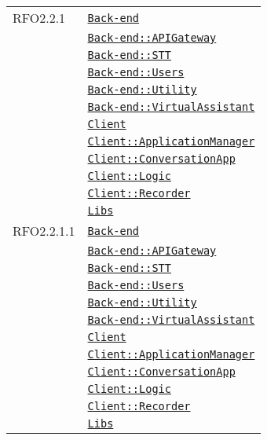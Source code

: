 \begin{longtable}{|>{\centering}m{3cm}|m{10cm}<{\centering}|}
RFO2.2.1 & \hyperref[Back-end]{\texttt{Back-end}}\\
& \hyperref[Back-end::APIGateway]{\texttt{Back-end::APIGateway}}\\
& \hyperref[Back-end::STT]{\texttt{Back-end::STT}}\\
& \hyperref[Back-end::Users]{\texttt{Back-end::Users}}\\
& \hyperref[Back-end::Utility]{\texttt{Back-end::Utility}}\\
& \hyperref[Back-end::VirtualAssistant]{\texttt{Back-end::VirtualAssistant}}\\
& \hyperref[Client]{\texttt{Client}}\\
& \hyperref[Client::ApplicationManager]{\texttt{Client::ApplicationManager}}\\
& \hyperref[Client::ConversationApp]{\texttt{Client::ConversationApp}}\\
& \hyperref[Client::Logic]{\texttt{Client::Logic}}\\
& \hyperref[Client::Recorder]{\texttt{Client::Recorder}}\\
& \hyperref[Libs]{\texttt{Libs}}\\ \hline

RFO2.2.1.1 & \hyperref[Back-end]{\texttt{Back-end}}\\
& \hyperref[Back-end::APIGateway]{\texttt{Back-end::APIGateway}}\\
& \hyperref[Back-end::STT]{\texttt{Back-end::STT}}\\
& \hyperref[Back-end::Users]{\texttt{Back-end::Users}}\\
& \hyperref[Back-end::Utility]{\texttt{Back-end::Utility}}\\
& \hyperref[Back-end::VirtualAssistant]{\texttt{Back-end::VirtualAssistant}}\\
& \hyperref[Client]{\texttt{Client}}\\
& \hyperref[Client::ApplicationManager]{\texttt{Client::ApplicationManager}}\\
& \hyperref[Client::ConversationApp]{\texttt{Client::ConversationApp}}\\
& \hyperref[Client::Logic]{\texttt{Client::Logic}}\\
& \hyperref[Client::Recorder]{\texttt{Client::Recorder}}\\
& \hyperref[Libs]{\texttt{Libs}}\\ \hline


\end{longtable}
